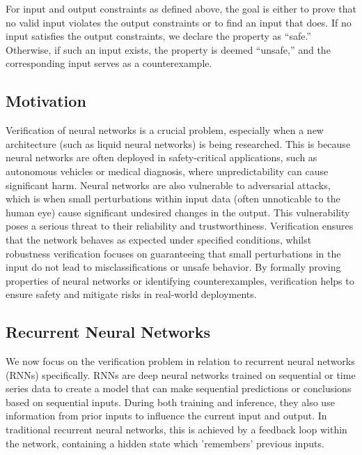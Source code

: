 For input and output constraints as defined above, the goal is either to prove that no valid input violates the output constraints or to find an input that does. If no input satisfies the output constraints, we declare the property as ``safe.'' Otherwise, if such an input exists, the property is deemed ``unsafe,'' and the corresponding input serves as a counterexample. \cite {henriksenEfficientNeuralNetwork}


\subsection{Motivation}

Verification of neural networks is a crucial problem, especially when a new architecture (such as liquid neural networks) is being researched. This is because neural networks are often deployed in safety-critical applications, such as autonomous vehicles or medical diagnosis, where unpredictability can cause significant harm. Neural networks are also vulnerable to adversarial attacks, which is when small perturbations within input data (often unnoticable to the human eye) cause significant undesired changes in the output. This vulnerability poses a serious threat to their reliability and trustworthiness. Verification ensures that the network behaves as expected under specified conditions, whilst robustness verification focuses on guaranteeing that small perturbations in the input do not lead to misclassifications or unsafe behavior. By formally proving properties of neural networks or identifying counterexamples, verification helps to ensure safety and mitigate risks in real-world deployments.

\subsection{Recurrent Neural Networks}

We now focus on the verification problem in relation to recurrent neural networks (RNNs) specifically. RNNs are deep neural networks trained on sequential or time series data to create a model that can make sequential predictions or conclusions based on sequential inputs. During both training and inference, they also use information from prior inputs to influence the current input and output. In traditional recurrent neural networks, this is achieved by a feedback loop within the network, containing a hidden state which 'remembers' previous inputs. \cite{WhatRecurrentNeural2021}

